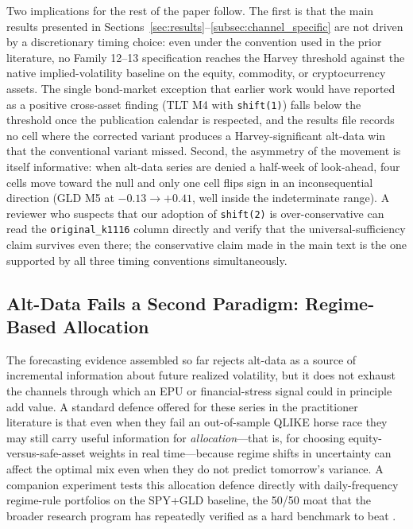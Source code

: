 \documentclass[12pt,a4paper]{article}
\begin{document}
Two implications for the rest of the paper follow. The first is that the main results presented in Sections~\ref{sec:results}--\ref{subsec:channel_specific} are not driven by a discretionary timing choice: even under the convention used in the prior literature, no Family 12--13 specification reaches the Harvey threshold against the native implied-volatility baseline on the equity, commodity, or cryptocurrency assets. The single bond-market exception that earlier work would have reported as a positive cross-asset finding (TLT M4 with \texttt{shift(1)}) falls below the threshold once the publication calendar is respected, and the results file records no cell where the corrected variant produces a Harvey-significant alt-data win that the conventional variant missed. Second, the asymmetry of the movement is itself informative: when alt-data series are denied a half-week of look-ahead, four cells move toward the null and only one cell flips sign in an inconsequential direction (GLD M5 at $-0.13 \to +0.41$, well inside the indeterminate range). A reviewer who suspects that our adoption of \texttt{shift(2)} is over-conservative can read the \texttt{original\_k1116} column directly and verify that the universal-sufficiency claim survives even there; the conservative claim made in the main text is the one supported by all three timing conventions simultaneously.


\subsection{Alt-Data Fails a Second Paradigm: Regime-Based Allocation}
\label{subsec:k1121_allocation}


The forecasting evidence assembled so far rejects alt-data as a source of incremental information about future realized volatility, but it does not exhaust the channels through which an EPU or financial-stress signal could in principle add value. A standard defence offered for these series in the practitioner literature is that even when they fail an out-of-sample QLIKE horse race they may still carry useful information for \emph{allocation}---that is, for choosing equity-versus-safe-asset weights in real time---because regime shifts in uncertainty can affect the optimal mix even when they do not predict tomorrow's variance. A companion experiment tests this allocation defence directly with daily-frequency regime-rule portfolios on the SPY+GLD baseline, the 50/50 moat that the broader research program has repeatedly verified as a hard benchmark to beat \citep{demiguel2009}.
\end{document}
